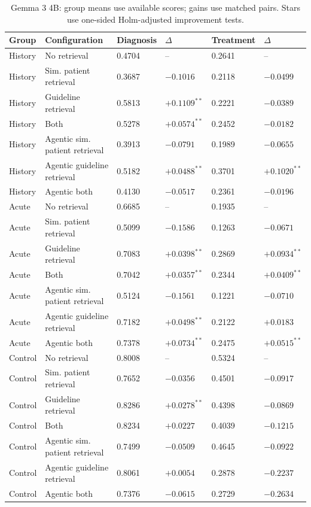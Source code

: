 \begin{table}[t]
\centering
\scriptsize
\begin{tabular}{llllll}
\toprule
Group & Configuration & Diagnosis & $\Delta$ & Treatment & $\Delta$ \\
\midrule
History & No retrieval & 0.4704 & -- & 0.2641 & -- \\
History & Sim. patient retrieval & 0.3687 & $-0.1016$ & 0.2118 & $-0.0499$ \\
History & Guideline retrieval & 0.5813 & $+0.1109^{**}$ & 0.2221 & $-0.0389$ \\
History & Both & 0.5278 & $+0.0574^{**}$ & 0.2452 & $-0.0182$ \\
History & Agentic sim. patient retrieval & 0.3913 & $-0.0791$ & 0.1989 & $-0.0655$ \\
History & Agentic guideline retrieval & 0.5182 & $+0.0488^{**}$ & 0.3701 & $+0.1020^{**}$ \\
History & Agentic both & 0.4130 & $-0.0517$ & 0.2361 & $-0.0196$ \\
\midrule
Acute & No retrieval & 0.6685 & -- & 0.1935 & -- \\
Acute & Sim. patient retrieval & 0.5099 & $-0.1586$ & 0.1263 & $-0.0671$ \\
Acute & Guideline retrieval & 0.7083 & $+0.0398^{**}$ & 0.2869 & $+0.0934^{**}$ \\
Acute & Both & 0.7042 & $+0.0357^{**}$ & 0.2344 & $+0.0409^{**}$ \\
Acute & Agentic sim. patient retrieval & 0.5124 & $-0.1561$ & 0.1221 & $-0.0710$ \\
Acute & Agentic guideline retrieval & 0.7182 & $+0.0498^{**}$ & 0.2122 & $+0.0183$ \\
Acute & Agentic both & 0.7378 & $+0.0734^{**}$ & 0.2475 & $+0.0515^{**}$ \\
\midrule
Control & No retrieval & 0.8008 & -- & 0.5324 & -- \\
Control & Sim. patient retrieval & 0.7652 & $-0.0356$ & 0.4501 & $-0.0917$ \\
Control & Guideline retrieval & 0.8286 & $+0.0278^{**}$ & 0.4398 & $-0.0869$ \\
Control & Both & 0.8234 & $+0.0227$ & 0.4039 & $-0.1215$ \\
Control & Agentic sim. patient retrieval & 0.7499 & $-0.0509$ & 0.4645 & $-0.0922$ \\
Control & Agentic guideline retrieval & 0.8061 & $+0.0054$ & 0.2878 & $-0.2237$ \\
Control & Agentic both & 0.7376 & $-0.0615$ & 0.2729 & $-0.2634$ \\
\midrule
\bottomrule
\end{tabular}
\caption{Gemma 3 4B: group means use available scores; gains use matched pairs. Stars use one-sided Holm-adjusted improvement tests.}
\end{table}
